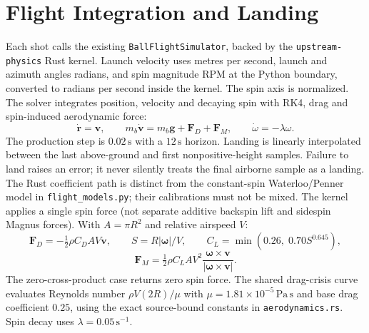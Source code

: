 \documentclass[11pt,letterpaper]{article}
\begin{document}
\section{Flight Integration and Landing}
Each shot calls the existing \texttt{BallFlightSimulator}, backed by the
\texttt{upstream-physics} Rust kernel. Launch velocity uses metres per second,
launch and azimuth angles radians, and spin magnitude RPM at the Python
boundary, converted to radians per second inside the kernel. The spin axis
is normalized. The solver integrates position, velocity and decaying spin
with RK4, drag and spin-induced aerodynamic force:
\[
 \dot{\mathbf r}=\mathbf v,\qquad
 m_b\dot{\mathbf v}=m_b\mathbf g+\mathbf F_D+\mathbf F_M,\qquad
 \dot\omega=-\lambda\omega.
\]
The production step is $0.02\,\mathrm{s}$ with a $12\,\mathrm{s}$ horizon.
Landing is linearly interpolated between the last above-ground and first
nonpositive-height samples. Failure to land raises an error; it never
silently treats the final airborne sample as a landing.
The Rust coefficient path is distinct from the constant-spin Waterloo/Penner
model in \texttt{flight\_models.py}; their calibrations must not be mixed.
The kernel applies a single spin force (not separate additive backspin lift
and sidespin Magnus forces). With $A=\pi R^2$ and relative airspeed $V$:
\[
 \mathbf F_D=-\tfrac12\rho C_D A V\mathbf v,\qquad
 S=R|\boldsymbol\omega|/V,\qquad
 C_L=\min(0.26,\;0.70 S^{0.645}),
\]
\[
 \mathbf F_M=\tfrac12\rho C_L A V^2
 \frac{\boldsymbol\omega\times\mathbf v}
 {|\boldsymbol\omega\times\mathbf v|}.
\]
The zero-cross-product case returns zero spin force. The shared drag-crisis
curve evaluates Reynolds number $\rho V(2R)/\mu$ with
$\mu=1.81\times10^{-5}\,\mathrm{Pa\,s}$ and base drag coefficient $0.25$,
using the exact source-bound constants in \texttt{aerodynamics.rs}.
Spin decay uses $\lambda=0.05\,\mathrm{s}^{-1}$.
\end{document}
